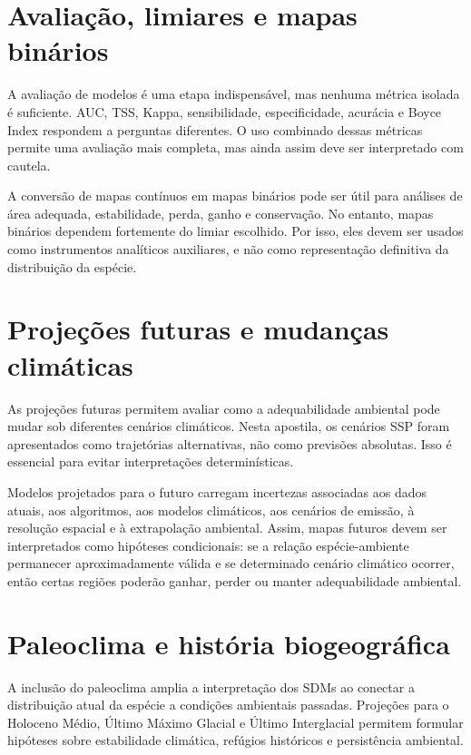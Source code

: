 \section{Avaliação, limiares e mapas binários}

A avaliação de modelos é uma etapa indispensável, mas nenhuma métrica isolada é suficiente. AUC, TSS, Kappa, sensibilidade, especificidade, acurácia e Boyce Index respondem a perguntas diferentes. O uso combinado dessas métricas permite uma avaliação mais completa, mas ainda assim deve ser interpretado com cautela.

A conversão de mapas contínuos em mapas binários pode ser útil para análises de área adequada, estabilidade, perda, ganho e conservação. No entanto, mapas binários dependem fortemente do limiar escolhido. Por isso, eles devem ser usados como instrumentos analíticos auxiliares, e não como representação definitiva da distribuição da espécie.

\section{Projeções futuras e mudanças climáticas}

As projeções futuras permitem avaliar como a adequabilidade ambiental pode mudar sob diferentes cenários climáticos. Nesta apostila, os cenários SSP foram apresentados como trajetórias alternativas, não como previsões absolutas. Isso é essencial para evitar interpretações determinísticas.

Modelos projetados para o futuro carregam incertezas associadas aos dados atuais, aos algoritmos, aos modelos climáticos, aos cenários de emissão, à resolução espacial e à extrapolação ambiental. Assim, mapas futuros devem ser interpretados como hipóteses condicionais: se a relação espécie-ambiente permanecer aproximadamente válida e se determinado cenário climático ocorrer, então certas regiões poderão ganhar, perder ou manter adequabilidade ambiental.

\section{Paleoclima e história biogeográfica}

A inclusão do paleoclima amplia a interpretação dos SDMs ao conectar a distribuição atual da espécie a condições ambientais passadas. Projeções para o Holoceno Médio, Último Máximo Glacial e Último Interglacial permitem formular hipóteses sobre estabilidade climática, refúgios históricos e persistência ambiental.

